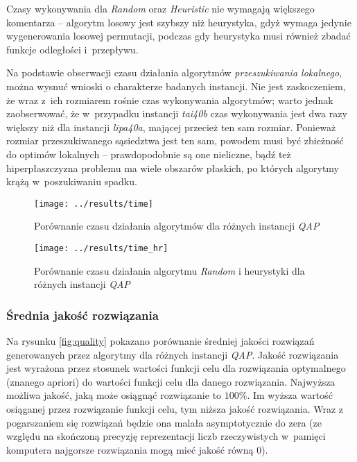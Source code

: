 \documentclass{article}
\begin{document}
			Czasy wykonywania dla \emph{Random} oraz \emph{Heuristic} nie wymagają większego komentarza -- algorytm losowy jest szybszy niż heurystyka, gdyż wymaga jedynie wygenerowania losowej permutacji, podczas gdy heurystyka musi również zbadać funkcje odległości i~przepływu.


			Na podstawie obserwacji czasu działania algorytmów \emph{przeszukiwania lokalnego}, można wysnuć wnioski o charakterze badanych instancji. Nie jest zaskoczeniem, że wraz z~ich rozmiarem rośnie czas wykonywania algorytmów; warto jednak zaobserwować, że w~przypadku instancji \emph{tai40b} czas wykonywania jest dwa razy większy niż dla instancji \emph{lipa40a}, mającej przecież ten sam rozmiar. Ponieważ rozmiar przeszukiwanego sąsiedztwa jest ten sam, powodem musi być zbieżność do optimów lokalnych -- prawdopodobnie są one nieliczne, bądź też hiperpłaszczyzna problemu ma wiele obszarów płaskich, po których algorytmy krążą w~poszukiwaniu spadku.

			\begin{figure}[h]
				\texttt{[image: ../results/time]}
				\caption{Porównanie czasu działania algorytmów dla różnych instancji \emph{QAP}\label{fig:time}}
			\end{figure}
			
			\begin{figure}[h]
				\texttt{[image: ../results/time\_hr]}
				\caption{Porównanie czasu działania algorytmu \emph{Random} i heurystyki dla różnych instancji \emph{QAP}\label{fig:time_hr}}
			\end{figure}

		\subsubsection{Średnia jakość rozwiązania\label{ss:meanquality}}
			Na rysunku \ref{fig:quality} pokazano porównanie średniej jakości rozwiązań generowanych przez algorytmy dla różnych instancji \emph{QAP}. Jakość rozwiązania jest wyrażona przez stosunek wartości funkcji celu dla rozwiązania optymalnego (znanego apriori) do wartości funkcji celu dla danego rozwiązania. Najwyższa możliwa jakość, jaką może osiągnąć rozwiązanie to $100\%$. Im wyższa wartość osiąganej przez rozwiązanie funkcji celu, tym niższa jakość rozwiązania. Wraz z pogarszaniem się rozwiązań będzie ona malała asymptotycznie do zera (ze względu na skończoną precyzję reprezentacji liczb rzeczywistych w~pamięci komputera najgorsze rozwiązania mogą mieć jakość równą 0).
\end{document}
